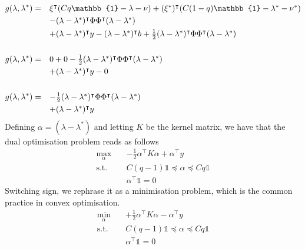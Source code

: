 \begin{equation}
    \begin{split}
        g(\lambda, \lambda^*) = \quad & \hbox{$\xi^\intercal(Cq\mathbb{1} - \lambda - \nu) + (\xi^*)^\intercal(C(1-q)\mathbb{1} - \lambda^* - \nu^*)$} \\
        & \hbox{$- (\lambda - \lambda^*)^\intercal \Phi \Phi^\intercal (\lambda - \lambda^*)$} \\
        & \hbox{$+ (\lambda - \lambda^*)^\intercal y - (\lambda - \lambda^*)^\intercal b + \frac{1}{2} (\lambda - \lambda^*)^\intercal \Phi \Phi^\intercal (\lambda - \lambda^*)$} \\
        \\
        g(\lambda, \lambda^*) = \quad & \hbox{$0 + 0 - \frac{1}{2} (\lambda - \lambda^*)^\intercal \Phi \Phi^\intercal (\lambda - \lambda^*)$} \\
        & \hbox{$+ (\lambda - \lambda^*)^\intercal y - 0$} \\
        \\
        g(\lambda, \lambda^*) = \quad & \hbox{$- \frac{1}{2} (\lambda - \lambda^*)^\intercal \Phi \Phi^\intercal (\lambda - \lambda^*)$} \\
        & \hbox{$+ (\lambda - \lambda^*)^\intercal y$}
    \end{split}
\end{equation}
Defining $\alpha=(\lambda-\lambda^*)$ and letting $K$ be the kernel matrix, we have that the dual optimisation problem reads as follows
\begin{equation}\label{eq:kqr_min6}
    \begin{aligned}
        \max_{\alpha} \quad & -\frac{1}{2}\alpha^\intercal K\alpha+\alpha^\intercal y\\
    \textrm{s.t.} \quad & 
    C(q-1)\mathbb{1}\preceq \alpha \preceq Cq\mathbb{1}\\
    &\alpha^\intercal\mathbb{1}=0
    \end{aligned}
    \end{equation}
Switching sign, we rephrase it as a minimisation problem, which is the common practice in convex optimisation.
\begin{equation}\label{eq:kqr_min7}
    \begin{aligned}
        \min_{\alpha} \quad & +\frac{1}{2}\alpha^\intercal K \alpha-\alpha^\intercal y\\
    \textrm{s.t.} \quad & 
    C(q-1)\mathbb{1}\preceq \alpha \preceq Cq\mathbb{1}\\
    &\alpha^\intercal\mathbb{1}=0
    \end{aligned}
    \end{equation}
